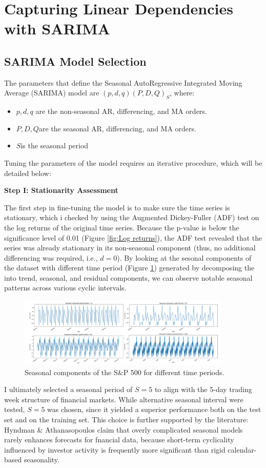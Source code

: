 \section{Capturing Linear Dependencies with SARIMA}
\subsection{SARIMA Model Selection}
The parameters that define the Seasonal AutoRegressive Integrated Moving Average (SARIMA) model are $(p,d,q) (P,D,Q)_S$, where:
\begin{itemize}
    \item \( p, d, q \) are the non-seasonal AR, differencing, and MA orders.
    \item \( P, D, Q \)are the seasonal AR, differencing, and MA orders.
    \item \( S \)is the seasonal period 
\end{itemize}
Tuning the parameters of the model requires an iterative procedure, which will be detailed below:

\textbf{Step I: Stationarity Assessment}

The first step in fine-tuning the model is to make sure the time series is stationary, which i checked by using the Augmented Dickey-Fuller (ADF) test on the log returns of the original time series.  Because the p-value is below the significance level of 0.01 (Figure \ref{fig:Log returns}), the ADF test revealed that the series was already stationary in its non-seasonal component (thus, no additional differencing was required, i.e., $d=0$). By looking at the sesonal components of the dataset with different time period (Figure \ref{fig:Seasonal components}) generated by decomposing the into trend, seasonal, and residual components, we can observe notable seasonal patterns across various cyclic intervals. 
\begin{figure}[H]
    \centering
    \includegraphics[width=0.9\textwidth]{Machine_learning_thesis/Images/seasonal components.png}
    \caption{Seasonal components of the S\&P 500 for different time periods.} 
    \label{fig:Seasonal components}
\end{figure}
I ultimately selected a seasonal period of $S=5$  to align with the 5-day trading week structure of financial markets.  While alternative seasonal interval were tested, $S=5$ was chosen, since it yielded a superior performance both on the test set and on the training set.  This choice is further supported by the literature: Hyndman \& Athanasopoulos \cite{Hyndman2018} claim that overly complicated seasonal models rarely enhances forecasts for fnancial data, because short-term cyclicality influenced by investor activity is frequently more significant than rigid calendar-based seasonality.

